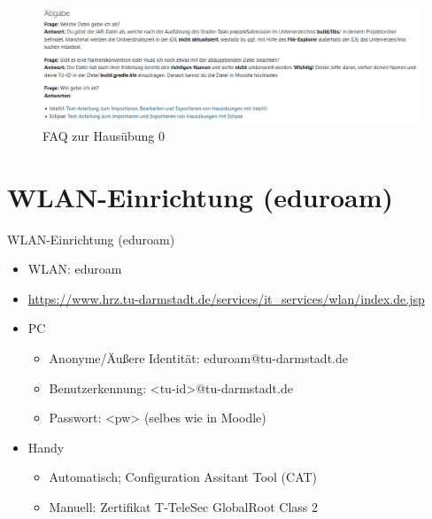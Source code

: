 \documentclass{../tuda-beamer}
\begin{document}
    \begin{frame}[c]
        \begin{figure}[h]
            \centering
            \includegraphics[width=.985\linewidth]{graphics/faq_example.png}
            \caption{FAQ zur Hausübung 0}
        \end{figure}
    \end{frame}


    \section{WLAN-Einrichtung (eduroam)}
    \begin{frame}{WLAN-Einrichtung (eduroam)}
        \begin{itemize}
            \item WLAN: eduroam
            \item \small \url{https://www.hrz.tu-darmstadt.de/services/it_services/wlan/index.de.jsp}
            \item PC
            \begin{itemize}
                \item Anonyme/Äußere Identität: eduroam@tu-darmstadt.de
                \item Benutzerkennung: <tu-id>@tu-darmstadt.de
                \item Passwort: <pw> (selbes wie in Moodle)
            \end{itemize}
            \item Handy
            \begin{itemize}
                \item Automatisch; Configuration Assitant Tool (CAT)
                \item Manuell: Zertifikat T-TeleSec GlobalRoot Class 2
            \end{itemize}
        \end{itemize}
    \end{frame}
\end{document}
